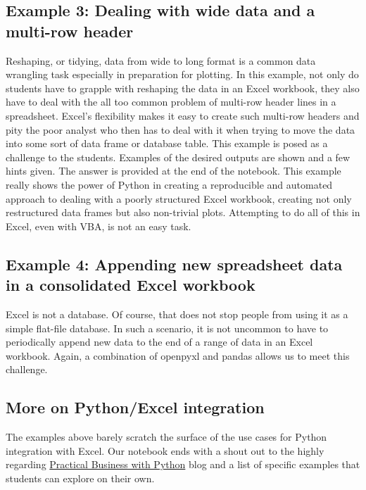 \documentclass[ited,blindrev]{informs3}              %
\begin{document}
\subsection{Example 3: Dealing with wide data and a multi-row header}

Reshaping, or tidying, data \cite{wickhamTidyData2014} from wide to long format is a common data wrangling task especially in preparation for plotting. In this example, not only do students have to grapple with reshaping the data in an Excel workbook, they also have to deal with the all too common problem of multi-row header lines in a spreadsheet. Excel's flexibility makes it easy to create such multi-row headers and pity the poor analyst who then has to deal with it when trying to move the data into some sort of data frame or database table. This example is posed as a challenge to the students. Examples of the desired outputs are shown and a few hints given. The answer is provided at the end of the notebook. This example really shows the power of Python in creating a reproducible and automated approach to dealing with a poorly structured Excel workbook, creating not only restructured data frames but also non-trivial plots. Attempting to do all of this in Excel, even with VBA, is not an easy task.

\subsection{Example 4: Appending new spreadsheet data in a consolidated Excel workbook}

Excel is not a database. Of course, that does not stop people from using it as a simple flat-file database. In such a scenario, it is not uncommon to have to periodically append new data to the end of a range of data in an Excel workbook. Again, a combination of openpyxl and pandas allows us to meet this challenge.

\subsection{More on Python/Excel integration}

The examples above barely scratch the surface of the use cases for Python integration with Excel. Our notebook ends with a shout out to the highly regarding \href{https://pbpython.com/}{Practical Business with Python} blog and a list of specific examples that students can explore on their own.
\end{document}
